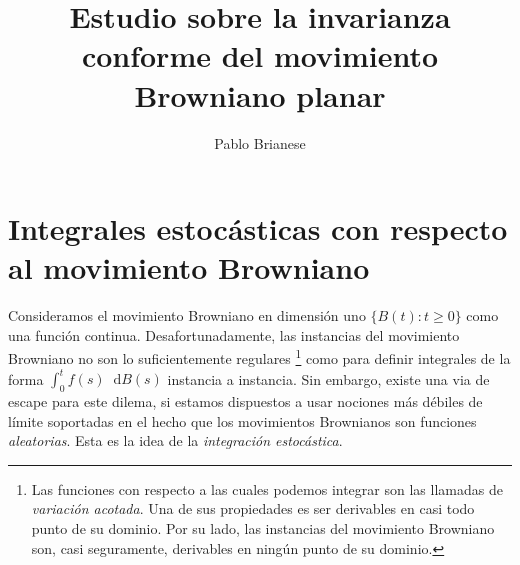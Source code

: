 \newcommand{\borel}{\mathscr{B}}
\newcommand{\metricSpace}{\mathcal{M}}
\newcommand{\brownian}{B}
\newcommand{\alteredBrownian}{\widetilde{\brownian}}
\newcommand{\wiener}{W}
\newcommand{\progressiveAlgebra}{\mathscr{E}}
\newcommand{\placeholderParameter}{-}
\newcommand{\dd}{\mathop{}\!\mathrm{d}}
\newcommand{\naturalNumbers}{\mathbb{N}}
\newcommand{\realNumbers}{\mathbb{R}}
\newcommand{\complexNumbers}{\mathbb{C}}
\DeclareMathOperator{\laplacian}{\Delta}
\DeclareMathOperator{\grad}{\nabla}
\DeclareMathOperator{\Expectation}{\mathbb{E}}
\DeclarePairedDelimiter{\abs}{\lvert}{\rvert}
\DeclarePairedDelimiter{\norm}{\|}{\|}
\DeclarePairedDelimiter{\ang}{\langle}{\rangle}
\DeclarePairedDelimiter{\ceil}{\lceil}{\rceil}
\DeclarePairedDelimiter{\floor}{\lfloor}{\rfloor}
\theoremstyle{plain}
\newtheorem{theorem}{Teorema}
\newtheorem{proposition}{Proposición}
\newtheorem{lemma}{Lema}
\newtheorem{corollary}{Corolario}
\newtheorem{property}{Propiedad}
\theoremstyle{remark}
\newtheorem{remark}{Observación}
\theoremstyle{definition}
\newtheorem{definition}{Definición}
\newtheorem{example}{Ejemplo}

\title{Estudio sobre la invarianza conforme del movimiento Browniano planar}
\author{Pablo Brianese}



\maketitle


\part{Integrales estocásticas con respecto al movimiento Browniano}

Consideramos el movimiento Browniano en dimensión uno \(\{\brownian(t) : t \geq 0\}\) como una función continua.
Desafortunadamente, las instancias del movimiento Browniano no son lo suficientemente regulares
\footnote{Las funciones con respecto a las cuales podemos integrar son las llamadas de \emph{variación acotada}.
Una de sus propiedades es ser derivables en casi todo punto de su dominio.
Por su lado, las instancias del movimiento Browniano son, casi seguramente, derivables en ningún punto de su dominio.}
como para definir integrales de la forma \(\int_0^t f(s) \dd \brownian(s)\) instancia a instancia.
Sin embargo, existe una via de escape para este dilema, si estamos dispuestos a usar nociones más débiles de límite soportadas en el hecho que los movimientos Brownianos son funciones \emph{aleatorias}.
Esta es la idea de la \emph{integración estocástica}.

